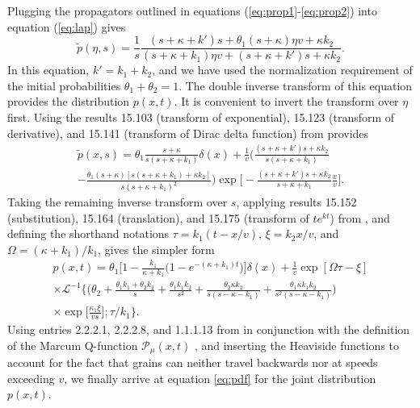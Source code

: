 \documentclass[]{agujournal2018}
\newcommand\be{\begin{equation}}
\newcommand\ee{\end{equation}}
\newcommand\tp{\tilde{p}}
\newcommand\El{\mathcal{L}}
\begin{document}
Plugging the propagators outlined in equations (\ref{eq:prop1}-\ref{eq:prop2}) into equation (\ref{eq:lap}) gives 
\be \tilde{p}(\eta,s) = \frac{1}{s}\frac{(s+\kappa + k')s  + \theta_1(s+\kappa )\eta v+ \kappa k_2}{(s+\kappa+k_1)\eta v+(s+\kappa+k')s + \kappa k_2}.\label{eq:nicedist}\ee
In this equation, $k'=k_1+k_2$, and we have used the normalization requirement of the initial probabilities $\theta_1 + \theta_2 = 1.$
The double inverse transform of this equation provides the distribution $p(x,t)$.
It is convenient to invert the transform over $\eta$ first.
Using the results 15.103 (transform of exponential), 15.123 (transform of derivative), and 15.141 (transform of Dirac delta function) from \citet{Arfken1985} provides 
\begin{multline} \tp(x,s) = \theta_1 \frac{s+\kappa}{s(s+\kappa + k_1)}\delta(x) + \frac{1}{v} \Big(\frac{(s+\kappa+k')s+\kappa k_2}{s(s+\kappa+k_1)} \\- \frac{\theta_1(s+\kappa)[s(s+\kappa+k_1)+\kappa k_2]}{s(s+\kappa+k_1)^2}\Big)
\exp\Big[-\frac{(s+\kappa+k')s+\kappa k_2}{s+\kappa+k_1}\frac{x}{v}\Big].\end{multline}
Taking the remaining inverse transform over $s$, applying results 15.152 (substitution), 15.164 (translation), and 15.175 (transform of $te^{kt}$) from \citet{Arfken1985}, and defining the shorthand notations $\tau = k_1(t-x/v)$, $\xi = k_2 x/v$, and $\Omega = (\kappa + k_1)/k_1$, gives the simpler form 
\begin{multline}
p(x,t) = \theta_1\Big[1-\frac{k_1}{\kappa + k_1}\big(1-e^{-(\kappa + k_1)t}\big)\Big]\delta(x) + \frac{1}{v}\exp[\Omega \tau - \xi]\\
\times \El^{-1}\Big\{\Big( \theta_2 + \frac{\theta_1k_1+\theta_2 k_2}{s}+\frac{\theta_1k_1k_2}{s^2} + \frac{\theta_2\kappa k_2}{s(s-\kappa-k_1)} + \frac{\theta_1\kappa k_1 k_2}{s^2(s-\kappa-k_1)}\Big)\\
\times\exp\big[\frac{\kappa_1 \xi}{vs}\big];\tau/k_1\Big\}.
\end{multline}
Using entries 2.2.2.1, 2.2.2.8, and 1.1.1.13 from \citet{Prudnikov1992a} in conjunction with the definition of the Marcum Q-function $ \mathcal{P}_\mu(x,t)$ \citep[e.g.][]{Temme1996}, and inserting the Heaviside functions to account for the fact that grains can neither travel backwards nor at speeds exceeding $v$, we finally arrive at equation \ref{eq:pdf} for the joint distribution $p(x,t)$.
\end{document}
